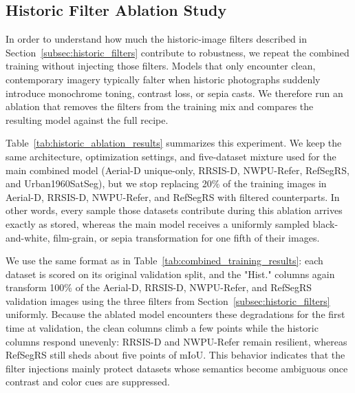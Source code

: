 \subsection{Historic Filter Ablation Study}
\label{subsec:historic_ablation}

In order to understand how much the historic-image filters described in Section~\ref{subsec:historic_filters} contribute to robustness, we repeat the combined training without injecting those filters. Models that only encounter clean, contemporary imagery typically falter when historic photographs suddenly introduce monochrome toning, contrast loss, or sepia casts. We therefore run an ablation that removes the filters from the training mix and compares the resulting model against the full recipe.

Table~\ref{tab:historic_ablation_results} summarizes this experiment. We keep the same architecture, optimization settings, and five-dataset mixture used for the main combined model (Aerial-D unique-only, RRSIS-D, NWPU-Refer, RefSegRS, and Urban1960SatSeg), but we stop replacing 20\% of the training images in Aerial-D, RRSIS-D, NWPU-Refer, and RefSegRS with filtered counterparts. In other words, every sample those datasets contribute during this ablation arrives exactly as stored, whereas the main model receives a uniformly sampled black-and-white, film-grain, or sepia transformation for one fifth of their images.

We use the same format as in Table~\ref{tab:combined_training_results}: each dataset is scored on its original validation split, and the "Hist." columns again transform 100\% of the Aerial-D, RRSIS-D, NWPU-Refer, and RefSegRS validation images using the three filters from Section~\ref{subsec:historic_filters} uniformly. Because the ablated model encounters these degradations for the first time at validation, the clean columns climb a few points while the historic columns respond unevenly: RRSIS-D and NWPU-Refer remain resilient, whereas RefSegRS still sheds about five points of mIoU. This behavior indicates that the filter injections mainly protect datasets whose semantics become ambiguous once contrast and color cues are suppressed.

